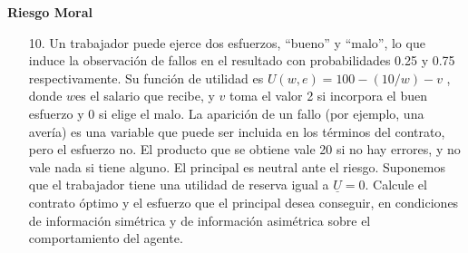 \documentclass[10pt,a4paper]{article}
\begin{document}
\textbf{\LARGE Riesgo Moral}
	\begin{enumerate}
		\item [10.] Un trabajador puede ejerce dos esfuerzos, ``bueno'' y ``malo'', lo que induce la observación de fallos en el resultado con probabilidades 0.25 y 0.75 respectivamente. Su función de utilidad es $U(w,e) = 100-(10/w)-v$ , donde $w$es el salario que recibe, y $v$ toma el valor 2 si incorpora el buen esfuerzo y 0 si elige el malo. La aparición de un fallo (por ejemplo, una avería) es una variable que puede ser incluida en los términos del contrato, pero el esfuerzo no. El producto que se obtiene vale 20 si no hay errores, y no vale nada si tiene alguno. El principal es neutral ante el riesgo. Suponemos que el trabajador tiene una utilidad de reserva igual a $\underline{U} =0$. Calcule el contrato óptimo y el esfuerzo que el principal desea conseguir, en condiciones de información simétrica y de información asimétrica sobre el comportamiento del agente.\\
			

\end{enumerate}
\end{document}
